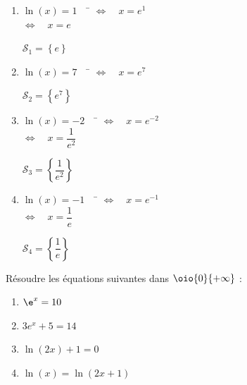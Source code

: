 \documentclass[a4paper,11pt,exos]{nsi} %
\begin{document}
\textcolor{UGLiBlue}{
    \begin{multicols}{2}
        \begin{enumerate}
            \item \begin{tabbing}
                $\ln(x)=1\quad$ \= $\iff \quad x=e^1$\\
                \> $\iff \quad x=e$
            \end{tabbing}
            $\mathcal{S}_1=\left\{e\right\}$
            \item \begin{tabbing}
                $\ln(x)=7\quad$ \= $\iff \quad x=e^7$
            \end{tabbing}
            $\mathcal{S}_2=\left\{e^7\right\}$
            \vfill\null
            \columnbreak
            \item \begin{tabbing}
                $\ln(x)=-2\quad$ \= $\iff \quad x=e^{-2}$\\
                \> $\iff \quad x=\dfrac{1}{e^2}$
            \end{tabbing}
            $\mathcal{S}_3=\left\{\dfrac{1}{e^2}\right\}$
            \item \begin{tabbing}
                $\ln(x)=-1\quad$ \= $\iff \quad x=e^{-1}$\\
                \> $\iff \quad x=\dfrac{1}{e}$
            \end{tabbing}
            $\mathcal{S}_4=\left\{\dfrac{1}{e}\right\}$
        \end{enumerate}
    \end{multicols}
}

\exo{}
Résoudre les équations suivantes dans $\oio{0}{+\infty}$ :
\begin{multicols}{4}
    \begin{enumerate}
        \item $\e^{x}=10$
        \item $3e^x+5=14$
        \item $\ln(2x)+1=0$
        \item $\ln(x)=\ln(2x+1)$
    \end{enumerate}
\end{multicols}
\end{document}
